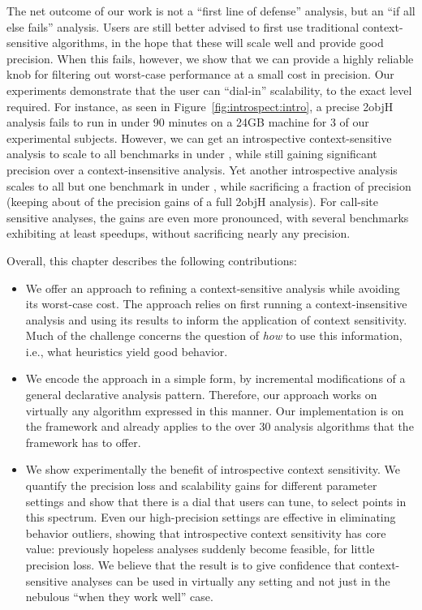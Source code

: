 The net outcome of our work is not a ``first line of defense'' analysis, but an ``if all else fails'' analysis. Users are still better advised to first use traditional context-sensitive algorithms, in the hope that these will scale well and provide good precision. When this fails, however, we show that we can provide a highly reliable knob for filtering out worst-case performance at a small cost in precision. Our experiments demonstrate that the user can ``dial-in'' scalability, to the exact level required. For instance, as seen in Figure~\ref{fig:introspect:intro}, a precise 2objH analysis fails to run in under 90 minutes on a 24GB machine for 3 of our experimental subjects. However, we can get an introspective context-sensitive analysis to scale to all benchmarks in under , while still gaining significant precision over a context-insensitive analysis. Yet another introspective analysis scales to all but one benchmark in under , while sacrificing a fraction of precision (keeping about  of the precision gains of a full 2objH analysis). For call-site sensitive analyses, the gains are even more pronounced, with several benchmarks exhibiting at least  speedups, without sacrificing nearly any precision.

Overall, this chapter describes the following contributions:

\begin{itemize}
\item We offer an approach to refining a context-sensitive analysis while avoiding its worst-case cost. The approach relies on first running a context-insensitive analysis and using its results to inform the application of context sensitivity. Much of the challenge concerns the question of \emph{how} to use this information, i.e., what heuristics yield good behavior.

\item We encode the approach in a simple form, by incremental modifications of a general declarative analysis pattern. Therefore, our approach works on virtually any algorithm expressed in this manner. Our implementation is on the \doop{} framework and already applies to the over 30 analysis algorithms that the framework has to offer.

\item We show experimentally the benefit of introspective context sensitivity. We quantify the precision loss and scalability gains for different parameter settings and show that there is a dial that users can tune, to select points in this spectrum. Even our high-precision settings are effective in eliminating behavior outliers, showing that introspective context sensitivity has core value: previously hopeless analyses suddenly become feasible, for little precision loss. We believe that the result is to give confidence that context-sensitive analyses can be used in virtually any setting and not just in the nebulous ``when they work well'' case.
\end{itemize}

